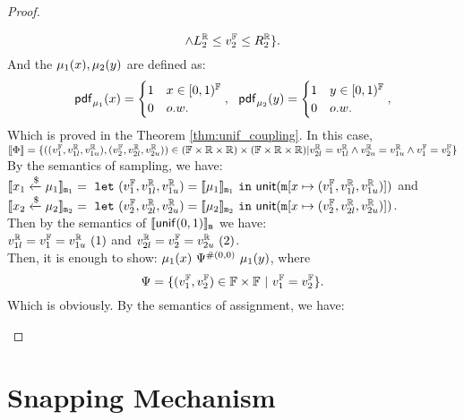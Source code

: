 \documentclass[a4paper,11pt]{article}
\begin{document}
\begin{proof}
\begin{itemize}
\[	\land 
	L^{\mathbb{R}}_2 \leq v^{\mathbb{F}}_2 \leq R^{\mathbb{R}}_2
	\}.
\]
And the $\mu_1(x), \mu_2(y)$ are defined as:
\[
	\mathsf{pdf}_{\mu_1}(x) = 
	\begin{cases}
	1 & x \in [0, 1)^{\mathbb{F}} 
	\\
	0       & o.w.
	\end{cases},
	~~
	\mathsf{pdf}_{\mu_2}(y) = 
	\begin{cases}
	1 & y \in [0, 1)^{\mathbb{F}}
	\\
	0       & o.w.
	\end{cases},
\]
	Which is proved in the Theorem \ref{thm:unif_coupling}.
	In this case, 
	$\llbracket \Phi \rrbracket = 
	\{((v^{\mathbb{F}}_1, v^{\mathbb{R}}_{1l}, v^{\mathbb{R}}_{1u}), (v^{\mathbb{F}}_2, v^{\mathbb{R}}_{2l}, v^{\mathbb{R}}_{2u})) 
	\in (\mathbb{F} \times \mathbb{R} \times \mathbb{R}) \times (\mathbb{F} \times \mathbb{R} \times \mathbb{R})
	|
	v^{\mathbb{R}}_{2l} = v^{\mathbb{R}}_{1l}
	\land
	v^{\mathbb{R}}_{2u} = v^{\mathbb{R}}_{1u}
	\land
	v^{\mathbb{F}}_1 = v^{\mathbb{F}}_2
	\}$
	\\
	By the semantics of sampling, we have:\\
	$\llbracket x_1 \xleftarrow{\$} \mu_1 \rrbracket_{\mathtt{m}_1} = 
	~\mathtt{let}~ (v^{\mathbb{F}}_1, v^{\mathbb{R}}_{1l}, v^{\mathbb{R}}_{1u}) 
	= \llbracket \mu_1 \rrbracket_{\mathtt{m}_1} 
	~\mathtt{in}~ 
	\mathsf{unit}(\mathtt{m}[x \mapsto (v^{\mathbb{F}}_1, v^{\mathbb{R}}_{1l}, v^{\mathbb{R}}_{1u})])
	$ and 
	$\llbracket x_2 \xleftarrow{\$} \mu_2 \rrbracket_{\mathtt{m}_2} = 
	~\mathtt{let}~ (v^{\mathbb{F}}_2, v^{\mathbb{R}}_{2l}, v^{\mathbb{R}}_{2u}) 
	= \llbracket \mu_2 \rrbracket_{\mathtt{m}_2} 
	~\mathtt{in}~ 
	\mathsf{unit}(\mathtt{m}[x \mapsto (v^{\mathbb{F}}_2, v^{\mathbb{R}}_{2l}, v^{\mathbb{R}}_{2u})])
	$. \\
	Then by the semantics of $\llbracket \mathsf{unif}(0, 1) \rrbracket_{\mathtt{m}}$ we have:
	\\
	$ v^{\mathbb{R}}_{1l} = v^{\mathbb{F}}_1 = v^{\mathbb{R}}_{1u} ~ (1)$ 
	and
	$ v^{\mathbb{R}}_{2l} = v^{\mathbb{F}}_2 = v^{\mathbb{R}}_{2u} ~ (2)$.
	\\
	Then, it is enough to show:
	${\mu_1}(x) ~ \Psi^{\#(0, 0)} ~ {\mu_1}(y)$, where
	\[
		\Psi = \{(v^{\mathbb{F}}_1, v^{\mathbb{F}}_2) \in \mathbb{F} \times \mathbb{F}
		~| ~
		v^{\mathbb{F}}_1 = v^{\mathbb{F}}_2 \}.
	\]
	Which is obviously.
	By the semantics of assignment, we have:\\
	\end{itemize}
\end{proof}


\newpage
\section{Snapping Mechanism}
\end{document}
